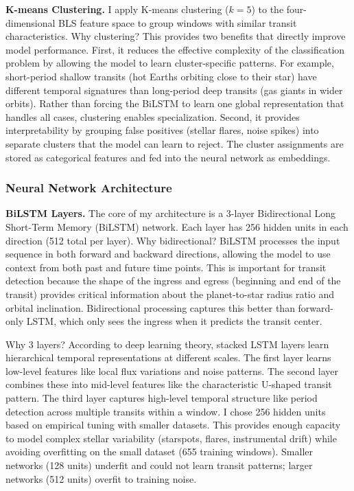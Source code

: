 \documentclass[letterpaper]{article} %
\begin{document}
\textbf{K-means Clustering.} I apply K-means clustering ($k=5$) to the four-dimensional BLS feature space to group windows with similar transit characteristics. Why clustering? This provides two benefits that directly improve model performance. First, it reduces the effective complexity of the classification problem by allowing the model to learn cluster-specific patterns. For example, short-period shallow transits (hot Earths orbiting close to their star) have different temporal signatures than long-period deep transits (gas giants in wider orbits). Rather than forcing the BiLSTM to learn one global representation that handles all cases, clustering enables specialization. Second, it provides interpretability by grouping false positives (stellar flares, noise spikes) into separate clusters that the model can learn to reject. The cluster assignments are stored as categorical features and fed into the neural network as embeddings.

\subsubsection{Neural Network Architecture}
\textbf{BiLSTM Layers.} The core of my architecture is a 3-layer Bidirectional Long Short-Term Memory (BiLSTM) network. Each layer has 256 hidden units in each direction (512 total per layer). Why bidirectional? BiLSTM processes the input sequence in both forward and backward directions, allowing the model to use context from both past and future time points. This is important for transit detection because the shape of the ingress and egress (beginning and end of the transit) provides critical information about the planet-to-star radius ratio and orbital inclination. Bidirectional processing captures this better than forward-only LSTM, which only sees the ingress when it predicts the transit center.

Why 3 layers? According to deep learning theory, stacked LSTM layers learn hierarchical temporal representations at different scales. The first layer learns low-level features like local flux variations and noise patterns. The second layer combines these into mid-level features like the characteristic U-shaped transit pattern. The third layer captures high-level temporal structure like period detection across multiple transits within a window. I chose 256 hidden units based on empirical tuning with smaller datasets. This provides enough capacity to model complex stellar variability (starspots, flares, instrumental drift) while avoiding overfitting on the small dataset (655 training windows). Smaller networks (128 units) underfit and could not learn transit patterns; larger networks (512 units) overfit to training noise.
\end{document}
